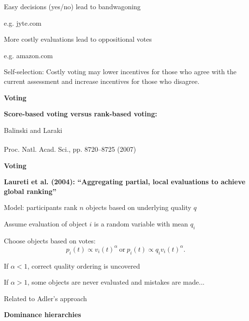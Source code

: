      Easy decisions (yes/no) lead to bandwagoning
      
       e.g. jyte.com
      
     More costly evaluations lead to oppositional votes
      
       e.g. amazon.com
      
    
    
     \alert{Self-selection:} Costly voting may lower incentives for those
      who agree with the current assessment and increase
      incentives for those who disagree.
    
  
  

  \textbf{Voting}
 
  \textbf{Score-based voting versus rank-based voting:}
    
     
      Balinski and Laraki\cite{balinski2007a}\\
      \\
      Proc. Natl. Acad. Sci., pp. 8720--8725 (2007)
    
    
  
  



  \textbf{Voting}

  \textbf{
      Laureti et al. (2004): 
      \alert{``Aggregating partial, local evaluations to achieve global ranking''}\cite{laureti2004b}
    }    
    
     
      Model: participants rank $n$ objects based on underlying quality $q$
     
      Assume evaluation of object $i$ is a random variable with mean $q_i$ 
     
      Choose objects based on votes:\\
      $$ p_i(t) \propto v_i(t)^{\alpha} \ \mbox{or} \ p_i(t) \propto q_i v_i(t)^{\alpha}. $$
     
      If $\alpha<1$, correct quality ordering is uncovered
     
      If $\alpha>1$, some objects are never evaluated and mistakes are made...
     
      Related to Adler's approach
    
  

%    
%    
  

  \textbf{Dominance hierarchies}


